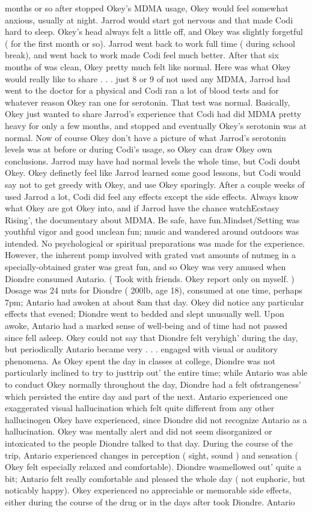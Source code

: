 \documentclass[12pt]{book}
\begin{document}
months or so after stopped Okey's MDMA usage, Okey would feel somewhat anxious, usually at night. Jarrod would start got nervous and that made Codi hard to sleep. Okey's head always felt a little off, and Okey was slightly forgetful ( for the first month or so). Jarrod went back to work full time ( during school break), and went back to work made Codi feel much better. After that six months of was clean, Okey pretty much felt like normal. Here was what Okey would really like to share . . .  just 8 or 9 of not used any MDMA, Jarrod had went to the doctor for a physical and Codi ran a lot of blood tests and for whatever reason Okey ran one for serotonin. That test was normal. Basically, Okey just wanted to share Jarrod's experience that Codi had did MDMA pretty heavy for only a few months, and stopped and eventually Okey's serotonin was at normal. Now of course Okey don't have a picture of what Jarrod's serotonin levels was at before or during Codi's usage, so Okey can draw Okey own conclusions. Jarrod may have had normal levels the whole time, but Codi doubt Okey. Okey definetly feel like Jarrod learned some good lessons, but Codi would say not to get greedy with Okey, and use Okey sparingly. After a couple weeks of used Jarrod a lot, Codi did feel any effects except the side effects. Always know what Okey are got Okey into, and if Jarrod have the chance watchEcstasy Rising', the documentary about MDMA. Be safe, have fun.Mindset/Setting was youthful vigor and good unclean fun; music and wandered around outdoors was intended. No psychological or spiritual preparations was made for the experience. However, the inherent pomp involved with grated vast amounts of nutmeg in a specially-obtained grater was great fun, and so Okey was very amused when Diondre consumed Antario. ( Took with friends. Okey report only on myself. ) Dosage was 24 nuts for Diondre ( 200lb, age 18), consumed at one time, perhaps 7pm; Antario had awoken at about 8am that day. Okey did notice any particular effects that evened; Diondre went to bedded and slept unusually well. Upon awoke, Antario had a marked sense of well-being and of time had not passed since fell asleep. Okey could not say that Diondre felt veryhigh' during the day, but periodically Antario became very . . .  engaged with visual or auditory phenomena. As Okey spent the day in classes at college, Diondre was not particularly inclined to try to justtrip out' the entire time; while Antario was able to conduct Okey normally throughout the day, Diondre had a felt ofstrangeness' which persisted the entire day and part of the next. Antario experienced one exaggerated visual hallucination which felt quite different from any other hallucinogen Okey have experienced, since Diondre did not recognize Antario as a hallucination. Okey was mentally alert and did not seem disorganized or intoxicated to the people Diondre talked to that day. During the course of the trip, Antario experienced changes in perception ( sight, sound ) and sensation ( Okey felt especially relaxed and comfortable). Diondre wasmellowed out' quite a bit; Antario felt really comfortable and pleased the whole day ( not euphoric, but noticably happy). Okey experienced no appreciable or memorable side effects, either during the course of the drug or in the days after took Diondre. Antario 
\end{document}
